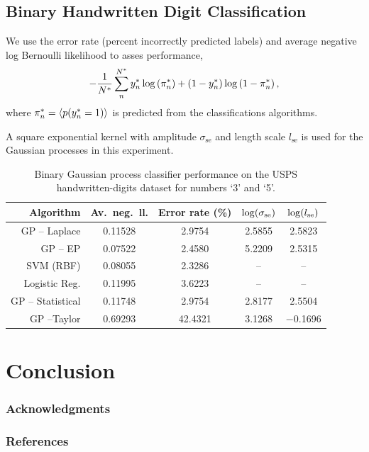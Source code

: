 \documentclass{article} %
\begin{document}
\subsection{Binary Handwritten Digit Classification}

We use the error rate (percent incorrectly predicted labels) and average 
negative log Bernoulli likelihood to asses performance,
\begin{equation}
    - \frac{1}{N^{*}} \sum^{N^{*}}_{n} y^{*}_n 
        \log\left({\pi^{*}_n}\right)
    + \left({1-y^{*}_n}\right)\log\left({1 - \pi^{*}_n}\right),
\end{equation}
where $\pi^{*}_n = \left\langle{\ensuremath{p\!\left({y^{*}_n = 1}\right)}}\right\rangle_{}$ is predicted from the
classifications algorithms.

A square exponential kernel with amplitude $\sigma_\text{se}$ and length
scale $l_\text{se}$ is used for the Gaussian processes in this experiment.

\begin{table}[htb]
    \centering
    \small
    \caption[]{Binary Gaussian process classifier performance on the USPS
        handwritten-digits dataset for numbers `3' and `5'.}
    \begin{tabular}{r| c c c c}
        Algorithm & Av.\ neg.\ ll. & Error rate (\%) 
            & $\log\!\left({\sigma_\text{se}}\right)$ & $\log\!\left({l_\text{se}}\right)$ \\
        \toprule
        GP -- Laplace & 0.11528 & 2.9754 & 2.5855 & 2.5823 \\
        GP -- EP & 0.07522 & 2.4580 & 5.2209 & 2.5315 \\
        SVM (RBF) & 0.08055 & 2.3286 & -- & -- \\
        Logistic Reg. & 0.11995 & 3.6223 & -- & -- \\
        \midrule
        GP -- Statistical & 0.11748 & 2.9754 &  2.8177 & 2.5504 \\
        GP --Taylor & 0.69293 & 42.4321 & 3.1268 & $-$0.1696 \\
        \bottomrule
    \end{tabular}
\end{table}

\section{Conclusion}

\subsubsection*{Acknowledgments}

\subsubsection*{References}
\printbibliography
\end{document}
